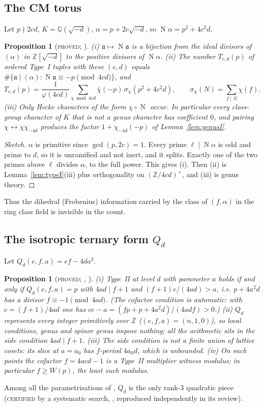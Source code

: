 \documentclass[10pt,reqno]{amsart}
\newtheorem{proposition}[theorem]{Proposition}
\theoremstyle{definition}
\numberwithin{equation}{section}
\newcommand{\Z}{\mathbb Z}
\newcommand{\Q}{\mathbb Q}
\DeclareMathOperator{\Nm}{N}
\newcommand{\status}[1]{\textup{\textsc{#1}}}
\begin{document}
\subsection{The CM torus}
Let $p\nmid2cd$, $K=\Q(\sqrt{-d})$, $\alpha=p+2c\sqrt{-d}$, so
$\Nm\alpha=p^2+4c^2d$.

\begin{proposition}[\status{proved}; {\cite[Lemma~5.1, Thm.~5.2]{O131}}]\label{prop:cm}
\textup{(i)} $\mathfrak a\mapsto\Nm\mathfrak a$ is a bijection from the
ideal divisors of $(\alpha)$ in $\Z[\sqrt{-d}]$ to the positive divisors of
$\Nm\alpha$.
\textup{(ii)} The number $T_{c,d}(p)$ of ordered Type~I tuples with these
$(c,d)$ equals $\#\{\mathfrak a\mid(\alpha):\Nm\mathfrak a\equiv-p\pmod{4cd}\}$, and
\[T_{c,d}(p)=\frac1{\varphi(4cd)}\sum_{\chi\bmod4cd}\bar\chi(-p)\,\sigma_\chi(p^2+4c^2d),
\qquad\sigma_\chi(N)=\sum_{f\mid N}\chi(f).\]
\textup{(iii)} Only Hecke characters of the form $\chi\circ\Nm$ occur. In
particular every class-group character of $K$ that is not a genus
character has coefficient $0$, and pairing $\chi\leftrightarrow\chi\chi_{-4d}$
produces the factor $1+\chi_{-4d}(-p)$ of Lemma~\ref{lem:genusI}.
\end{proposition}
\begin{proof}[Sketch]
$\alpha$ is primitive since $\gcd(p,2c)=1$. Every prime $\ell\mid\Nm\alpha$
is odd and prime to $d$, so it is unramified and not inert, and it splits.
Exactly one of the two primes above $\ell$ divides $\alpha$, to the full
power. This gives (i). Then (ii) is Lemma~\ref{lem:typeI}(iii) plus
orthogonality on $(\Z/4cd)^\times$, and (iii) is genus theory.
\end{proof}
Thus the dihedral (Frobenius) information carried by the class of
$(f,\alpha)$ in the ring class field is invisible in the count.

\subsection{The isotropic ternary form $Q_d$}
Let $Q_d(e,f,a)=ef-4da^2$.

\begin{proposition}[\status{proved}; {\cite[Prop.~6.2]{O124}}, {\cite[\S6]{RT1}}]\label{prop:Qd}
\textup{(i)} Type~II at level $d$ with parameter $a$ holds if and only if
$Q_d(e,f,a)=p$ with $4ad\mid f+1$ and $(f+1)e/(4ad)>a$, i.e.
$p+4a^2d$ has a divisor $f\equiv-1\pmod{4ad}$. (The cofactor condition is
automatic: with $c=(f+1)/4ad$ one has $ce-a=(fp+p+4a^2d)/(4adf)>0$.)
\textup{(ii)} $Q_d$ represents every integer primitively over $\Z$
($(e,f,a)=(n,1,0)$), so local conditions, genus and spinor genus impose
nothing; all the arithmetic sits in the side condition $4ad\mid f+1$.
\textup{(iii)} The side condition is not a finite union of lattice cosets:
its slice at $a=a_0$ has $f$-period $4a_0d$, which is unbounded.
\textup{(iv)} On such points the cofactor $f=4acd-1$ is a Type~II
\emph{multiplier witness modulus}; in particular $f\ge W(p)$, the least
such modulus.
\end{proposition}
Among all the parametrisations of \cite[\S2]{ET}, $Q_d$ is the only
rank-$3$ quadratic piece (\status{certified} by a systematic search,
\cite[Comp.~6.1]{O124}, reproduced independently in its review).
\end{document}
